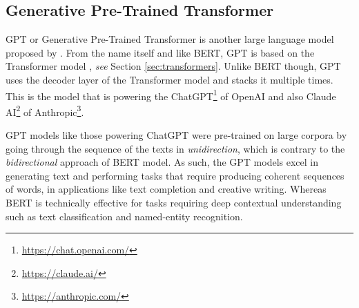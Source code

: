 \subsection{Generative Pre-Trained Transformer}
GPT or Generative Pre-Trained Transformer is another large language model proposed by \cite{radford2018improving}. From the name itself and like BERT, GPT is based on the Transformer model \cite{vaswani2017attention}, \textit{see} Section \ref{sec:transformers}. Unlike BERT though, GPT uses the decoder layer of the Transformer model and stacks it multiple times. This is the model that is powering the ChatGPT\footnote{\url{https://chat.openai.com/}} of OpenAI and also Claude AI\footnote{\url{https://claude.ai/}} of Anthropic\footnote{\url{https://anthropic.com/}}.

GPT models like those powering ChatGPT were pre-trained on large corpora by going through the sequence of the texts in \textit{unidirection}, which is contrary to the \textit{bidirectional} approach of BERT model. As such, the GPT models excel in generating text and performing tasks that require producing coherent sequences of words, in applications like text completion and creative writing. Whereas BERT is technically effective for tasks requiring deep contextual understanding such as text classification and named-entity recognition.